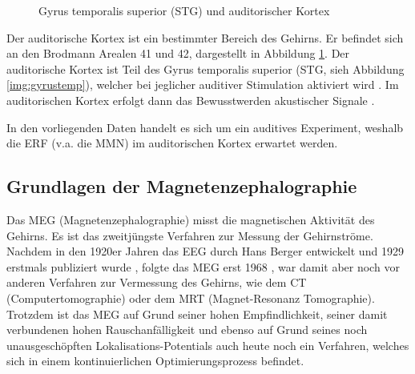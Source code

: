 \documentclass[doc,a4paper,12pt]{apa6}
\begin{document}
\begin{figure}[t]
\begin{subfigure}[c]{0.47\textwidth}
    \label{img:audicort}
  \end{subfigure}
  \vspace*{3mm}
  \caption{Gyrus temporalis superior (STG) und auditorischer Kortex}
  \label{img:audi}
\end{figure}

Der auditorische Kortex ist ein bestimmter Bereich des Gehirns. Er befindet sich an den Brodmann Arealen 41 und 42, dargestellt in Abbildung \ref{img:audicort}. Der auditorische Kortex ist Teil des Gyrus temporalis superior (STG, sieh Abbildung \ref{img:gyrustemp}), welcher bei jeglicher auditiver Stimulation aktiviert wird \parencite{binder1994functional}. Im auditorischen Kortex erfolgt dann das Bewusstwerden akustischer Signale \parencite{jaaskelainen2004human}.

In den vorliegenden Daten handelt es sich um ein auditives Experiment, weshalb die ERF (v.a. die MMN) im auditorischen Kortex erwartet werden.


\subsection{Grundlagen der Magnetenzephalographie}

Das MEG (Magnetenzephalographie) misst die magnetischen Aktivität des Gehirns. Es ist das zweitjüngste Verfahren zur Messung der Gehirnströme. Nachdem in den 1920er Jahren das EEG durch Hans Berger entwickelt und 1929 erstmals publiziert wurde \parencite{berger1929elektrenkephalogramm}, folgte das MEG erst 1968 \parencite{cohen1968magnetoencephalography}, war damit aber noch vor anderen Verfahren zur Vermessung des Gehirns, wie dem CT (Computertomographie) oder dem MRT (Magnet-Resonanz Tomographie). Trotzdem ist das MEG auf Grund seiner hohen Empfindlichkeit, seiner damit verbundenen hohen Rauschanfälligkeit und ebenso auf Grund seines noch unausgeschöpften Lokalisations-Potentials auch heute noch ein Verfahren, welches sich in einem kontinuierlichen Optimierungsprozess befindet.
\end{document}
